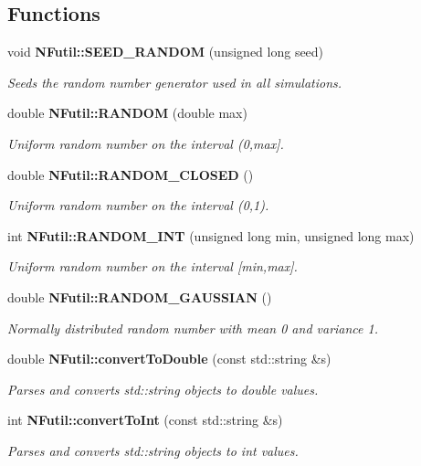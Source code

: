 \subsection*{Functions}
\begin{CompactItemize}
\item 
void {\bf NFutil::SEED\_\-RANDOM} (unsigned long seed)
\begin{CompactList}\small\item\em Seeds the random number generator used in all simulations. \item\end{CompactList}\item 
double {\bf NFutil::RANDOM} (double max)
\begin{CompactList}\small\item\em Uniform random number on the interval (0,max]. \item\end{CompactList}\item 
double {\bf NFutil::RANDOM\_\-CLOSED} ()
\begin{CompactList}\small\item\em Uniform random number on the interval (0,1). \item\end{CompactList}\item 
int {\bf NFutil::RANDOM\_\-INT} (unsigned long min, unsigned long max)
\begin{CompactList}\small\item\em Uniform random number on the interval [min,max]. \item\end{CompactList}\item 
double {\bf NFutil::RANDOM\_\-GAUSSIAN} ()
\begin{CompactList}\small\item\em Normally distributed random number with mean 0 and variance 1. \item\end{CompactList}\item 
double {\bf NFutil::convertToDouble} (const std::string \&s)
\begin{CompactList}\small\item\em Parses and converts std::string objects to double values. \item\end{CompactList}\item 
int {\bf NFutil::convertToInt} (const std::string \&s)
\begin{CompactList}\small\item\em Parses and converts std::string objects to int values. \item\end{CompactList}\item 

\end{CompactItemize}
